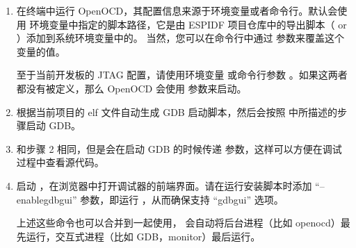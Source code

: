 \documentclass[a4paper,12pt,english]{sphinxmanual}
\begin{document}
\begin{enumerate}
%
\item {} 
\sphinxAtStartPar
{}

\sphinxAtStartPar
在终端中运行 OpenOCD，其配置信息来源于环境变量或者命令行。默认会使用  环境变量中指定的脚本路径，它是由 ESP\sphinxhyphen{}IDF 项目仓库中的导出脚本（ or ）添加到系统环境变量中的。 当然，您可以在命令行中通过  参数来覆盖这个变量的值。

\sphinxAtStartPar
至于当前开发板的 JTAG 配置，请使用环境变量  或命令行参数 。如果这两者都没有被定义，那么 OpenOCD 会使用  参数来启动。

\item {} 
\sphinxAtStartPar
{}

\sphinxAtStartPar
根据当前项目的 elf 文件自动生成 GDB 启动脚本，然后会按照  中所描述的步骤启动 GDB。

\item {} 
\sphinxAtStartPar
{}

\sphinxAtStartPar
和步骤 2 相同，但是会在启动 GDB 的时候传递  参数，这样可以方便在调试过程中查看源代码。

\item {} 
\sphinxAtStartPar
{}

\sphinxAtStartPar
启动 ，在浏览器中打开调试器的前端界面。请在运行安装脚本时添加 “–enable\sphinxhyphen{}gdbgui” 参数，即运行 ，从而确保支持 “gdbgui” 选项。

\sphinxAtStartPar
上述这些命令也可以合并到一起使用， 会自动将后台进程（比如 openocd）最先运行，交互式进程（比如 GDB，monitor）最后运行。


\end{enumerate}
\end{document}
